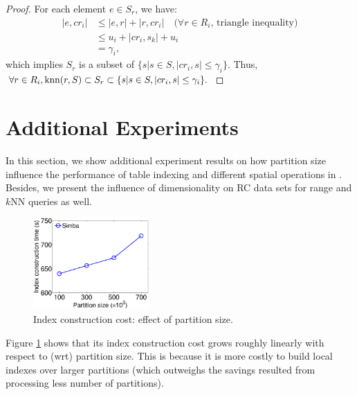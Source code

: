 \begin{appendix}
\begin{proof}
For each element $e \in S_r$, we have:
\begin{align*}
  |e, cr_i| & \leq |e, r| + |r, cr_i| \quad (\forall r\in R_i \textrm{, triangle inequality)} \\
  & \leq u_i + |cr_i, s_k| + u_i \\
  & = \gamma_i,
\end{align*}
 which implies $S_r$ is a subset
of $\{s|s \in S, |cr_i, s| \leq \gamma_i\}$.  Thus, $\forall r \in
R_i, \operatorname{knn}(r, S) \subset S_r \subset \{s|s \in S, |cr_i, s| \leq
\gamma_i\}.$
\end{proof}

\section{Additional Experiments}
\label{sec:addexp}
In this section, we show additional experiment results on how partition size influence
the performance of table indexing and different spatial operations in \name. Besides,
we present the influence of dimensionality on RC data sets for range and $k$NN queries
as well. 

\begin{figure}[!h]
	\centering
	\includegraphics[width = 1.74in]{figs/exp/osm_index_partsize_time}\vspace{-4mm}
	\caption{Index construction cost: effect of partition size.}
	\label{fig:index_partsize}\vspace{-1mm}
\end{figure}

Figure \ref{fig:index_partsize} shows that its index construction cost
grows roughly linearly with respect to (wrt) partition size. This is
because it is more costly to build local indexes over larger
partitions (which outweighs the savings resulted from processing less
number of partitions). %


\end{appendix}
